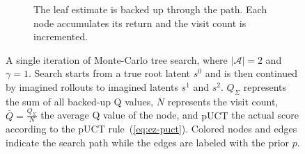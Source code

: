 \begin{figure}[htbp]
\begin{subfigure}[b]{\textwidth}
\begin{minipage}[c]{0.60\textwidth}
    \end{minipage}\hfill
    \begin{minipage}[c]{0.36\textwidth}
      \caption{The leaf estimate is backed up through the path. Each node accumulates
        its return and the visit count is incremented.}
      \label{fig:ez-mcts-backup}
    \end{minipage}
  \end{subfigure}

  \caption[One \gls{mcts} simulation]{A single iteration of Monte-Carlo
    tree search, where $\lvert\mathcal{A}\rvert=2$ and $\gamma=1$.
    Search starts from a true root latent $s^0$ and is then continued by imagined rollouts
    to imagined latents $s^1$ and $s^2$.
    $Q_\Sigma$ represents the sum of all backed-up Q values, $N$ represents the visit count,
    $\bar{Q}=\frac{Q_\Sigma}{N}$ the average Q value of the node, and $\text{pUCT}$ the actual score
    according to the pUCT rule~(\cref{eq:ez-puct}).
    Colored nodes and edges indicate the search path while the edges are labeled with the prior $p$.}
  \label{fig:ez-mcts-simulation}
\end{figure}
